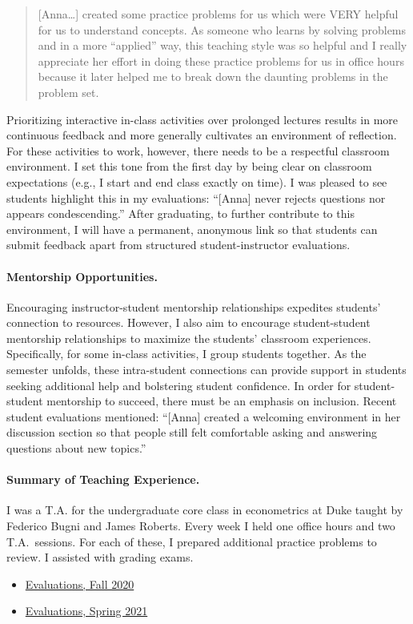 \begin{quote}
[Anna\ldots] created some practice problems for us which were VERY helpful for us to understand concepts. As someone who learns by solving problems and in a more ``applied'' way, this teaching style was so helpful and I really appreciate her effort in doing these practice problems for us in office hours because it later helped me to break down the daunting problems in the problem set.
\end{quote}

Prioritizing interactive in-class activities over prolonged lectures results in more continuous feedback and more generally cultivates an environment of reflection. For these activities to work, however, there needs to be a respectful classroom environment. I set this tone from the first day by being clear on classroom expectations (e.g., I start and end class exactly on time). I was pleased to see students highlight this in my evaluations: ``[Anna] never rejects questions nor appears condescending.'' After graduating, to further contribute to this environment, I will have a permanent, anonymous link so that students can submit feedback apart from structured student-instructor evaluations. 

\paragraph{Mentorship Opportunities.} Encouraging instructor-student mentorship relationships expedites students' connection to resources. However, I also aim to encourage student-student mentorship relationships to maximize the students' classroom experiences. Specifically, for some in-class activities, I group students together. As the semester unfolds, these intra-student connections can provide support in students seeking additional help and bolstering student confidence. In order for student-student mentorship to succeed, there must be an emphasis on inclusion. Recent student evaluations mentioned: ``[Anna] created a welcoming environment in her discussion section so that people still felt comfortable asking and answering questions about new topics.'' 


\paragraph{Summary of Teaching Experience.}

I was a T.A. for the undergraduate core class in econometrics at Duke taught by Federico Bugni and James Roberts. Every week I held one office hours and two T.A.\ sessions. For each of these, I prepared additional practice problems to review. I assisted with grading exams. 
\begin{itemize}
    \item \href{https://www.dropbox.com/s/kzoov8nko2mhg5t/Ziff_Anna_Econ%20104.pdf?dl=0}{Evaluations, Fall 2020}
    \item \href{https://www.dropbox.com/s/kjijwsarvrrdj5s/Ziff_Anna_Econ%20204.pdf?dl=0}{Evaluations, Spring 2021}
\end{itemize}

